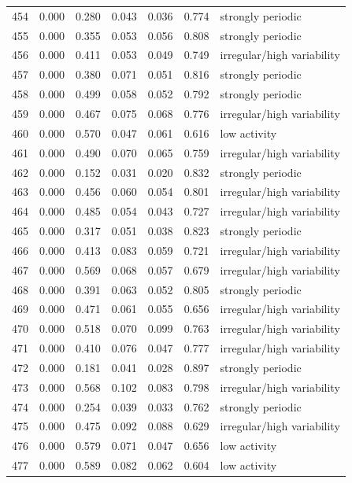 \begin{longtable}{lrrrrrl}
454 & 0.000 & 0.280 & 0.043 & 0.036 & 0.774 & strongly periodic \\
455 & 0.000 & 0.355 & 0.053 & 0.056 & 0.808 & strongly periodic \\
456 & 0.000 & 0.411 & 0.053 & 0.049 & 0.749 & irregular/high variability \\
457 & 0.000 & 0.380 & 0.071 & 0.051 & 0.816 & strongly periodic \\
458 & 0.000 & 0.499 & 0.058 & 0.052 & 0.792 & strongly periodic \\
459 & 0.000 & 0.467 & 0.075 & 0.068 & 0.776 & irregular/high variability \\
460 & 0.000 & 0.570 & 0.047 & 0.061 & 0.616 & low activity \\
461 & 0.000 & 0.490 & 0.070 & 0.065 & 0.759 & irregular/high variability \\
462 & 0.000 & 0.152 & 0.031 & 0.020 & 0.832 & strongly periodic \\
463 & 0.000 & 0.456 & 0.060 & 0.054 & 0.801 & irregular/high variability \\
464 & 0.000 & 0.485 & 0.054 & 0.043 & 0.727 & irregular/high variability \\
465 & 0.000 & 0.317 & 0.051 & 0.038 & 0.823 & strongly periodic \\
466 & 0.000 & 0.413 & 0.083 & 0.059 & 0.721 & irregular/high variability \\
467 & 0.000 & 0.569 & 0.068 & 0.057 & 0.679 & irregular/high variability \\
468 & 0.000 & 0.391 & 0.063 & 0.052 & 0.805 & strongly periodic \\
469 & 0.000 & 0.471 & 0.061 & 0.055 & 0.656 & irregular/high variability \\
470 & 0.000 & 0.518 & 0.070 & 0.099 & 0.763 & irregular/high variability \\
471 & 0.000 & 0.410 & 0.076 & 0.047 & 0.777 & irregular/high variability \\
472 & 0.000 & 0.181 & 0.041 & 0.028 & 0.897 & strongly periodic \\
473 & 0.000 & 0.568 & 0.102 & 0.083 & 0.798 & irregular/high variability \\
474 & 0.000 & 0.254 & 0.039 & 0.033 & 0.762 & strongly periodic \\
475 & 0.000 & 0.475 & 0.092 & 0.088 & 0.629 & irregular/high variability \\
476 & 0.000 & 0.579 & 0.071 & 0.047 & 0.656 & low activity \\
477 & 0.000 & 0.589 & 0.082 & 0.062 & 0.604 & low activity \\

\end{longtable}
